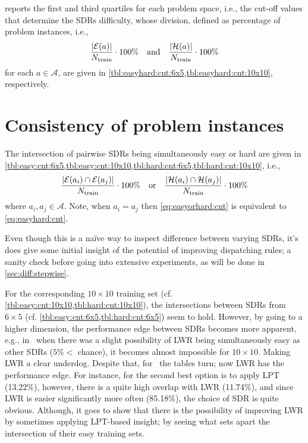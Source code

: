  reports the first and third quartiles for each 
problem space, i.e., the cut-off values that determine the SDRs difficulty, 
whose division, defined as percentage of problem instances, i.e., 
\begin{equation}\label{eq:easyhard:cnt}
  \frac{\abs{\mathcal{E}(a)}}{N_{\text{train}}} \cdot 100\%
  \quad \text{and} \quad 
  \frac{\abs{\mathcal{H}(a)}}{N_{\text{train}}}\cdot 100\%
\end{equation}
for each $a\in\mathcal{A}$, are given in \cref{tbl:easyhard:cnt:6x5,tbl:easyhard:cnt:10x10}, respectively. 

{\setlength{\tabcolsep}{3pt} 
  
  
}

\section{Consistency of problem instances}
The intersection of pairwise SDRs being simultaneously easy or hard are given in \cref{tbl:easy:cnt:6x5,tbl:easy:cnt:10x10,tbl:hard:cnt:6x5,tbl:hard:cnt:10x10}, i.e., 
\begin{equation}\label{eq:easyorhard:cnt}
  \frac{\abs{\mathcal{E}(a_i)\cap \mathcal{E}(a_j) }}{N_{\text{train}}} \cdot 
  100\%
  \quad \text{or} \quad 
  \frac{\abs{\mathcal{H}(a_i)\cap \mathcal{H}(a_j)}}{N_{\text{train}}}\cdot 
  100\%
\end{equation}
where $a_i,a_j\in\mathcal{A}$. Note, when $a_i=a_j$ then \cref{eq:easyorhard:cnt} is equivalent to \cref{eq:easyhard:cnt}.

{\setlength{\tabcolsep}{3pt} 
  
  
  
  
  
}

Even though this is a na\"ive way to inspect difference between varying SDRs, it's does give some initial insight of the potential of improving dispatching rules; a sanity check before going into extensive experiments, as will be done in \cref{sec:diff:stepwise}.

For the corresponding $10\times10$ training set (cf. \cref{tbl:easy:cnt:10x10,tbl:hard:cnt:10x10}), the intersections between SDRs from $6\times5$ (cf. \cref{tbl:easy:cnt:6x5,tbl:hard:cnt:6x5}) seem to hold. 
However, by going to a higher dimension, the performance edge between SDRs becomes more apparent, e.g., in \JSP\ when there was a slight possibility of LWR being simultaneously easy as other SDRs ($5\%<$ chance), it becomes almost impossible for $10\times10$. 
Making LWR a clear underdog. 
Despite that, for \FSP\ the tables turn; now LWR has the performance edge. 
For instance, for  the second  best option is to apply LPT 
(13.22\%), however, there is a quite high overlap with LWR (11.74\%), and since 
LWR is easier significantly more often (85.18\%), the choice of SDR is quite 
obvious. 
Although, it goes to show that there is the possibility of improving LWR by sometimes applying LPT-based insight; by seeing what sets apart the intersection of their easy training sets. 

